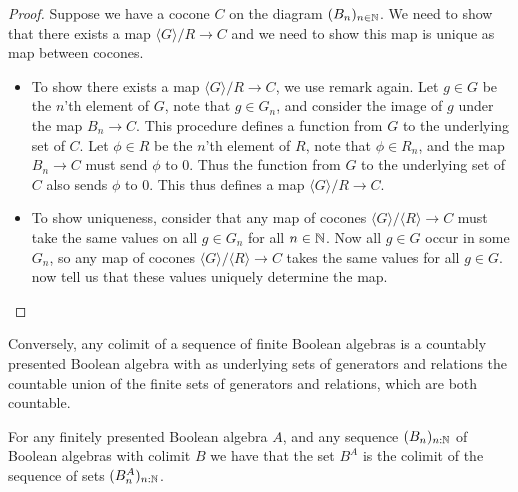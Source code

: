 \begin{proof}
  Suppose we have a cocone $C$ on the diagram $(B_n)_{n\in\mathbb{N}}$. 
  We need to show that there exists a map $\langle G \rangle / R\to C$ and
  we need to show this map is unique as map between cocones. 
  \begin{itemize}
    \item To show there exists a map $\langle G \rangle / R \to C$, 
      we use remark  again. 
      Let $g\in G$ be the $n$'th element of $G$, 
      note that $g\in G_n$, and consider the image of $g$ under the map $B_n \to C$. 
      This procedure defines a function from $G$ to the underlying set of $C$. 
      Let $\phi \in R$ be the $n$'th element of $R$, 
      note that $\phi \in R_n$, and the map $B_n \to C$ must send $\phi$ to $0$. 
      Thus the function from $G$ to the underlying set of $C$ also sends $\phi$ to $0$. 
      This thus defines a map $\langle G \rangle / R \to C$. 
    \item To show uniqueness, consider that any map of cocones $\langle G \rangle / \langle R \rangle \to C$ 
      must take the same values on all $g\in G_n$ for all $n\in\mathbb{N}$. 
      Now all $g\in G$ occur in some $G_n$, so any map of cocones $\langle G \rangle /  \langle R \rangle \to C$ 
      takes the same values for all $g\in G$. 
       now tell us that these values uniquely determine the map. 
  \end{itemize}
\end{proof}
\begin{remark}
  Conversely, any colimit of a sequence of finite Boolean algebras 
  is a countably presented Boolean algebra with 
  as underlying sets of generators and relations the countable union of the finite sets of 
  generators and relations, which are both countable. 
\end{remark}
\begin{lemma}\label{lemFinitelyPresentedBACompact}
  For any finitely presented Boolean algebra $A$,
  and any sequence $(B_n)_{n:\mathbb{N}}$ of Boolean algebras with colimit $B$
  we have that the set $B^A$ is the colimit of the sequence of sets $(B_n^A)_{n:\mathbb{N}}$. 
\end{lemma}  

